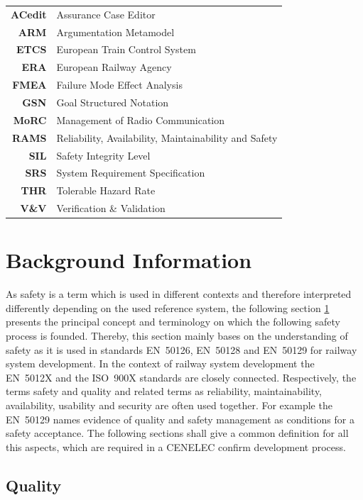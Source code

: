 \documentclass{template/openetcs_report}
\begin{document}
\begin{tabular}{rl}
\textbf{ACedit} & Assurance Case Editor \\ 
\textbf{ARM} & Argumentation  Metamodel \\ 
\textbf{ETCS} & European Train Control System \\ \textbf{ERA} & European Railway Agency \\ \textbf{FMEA} & Failure Mode Effect Analysis \\ 
\textbf{GSN} & Goal Structured Notation \\ 
\textbf{MoRC} & Management of Radio Communication \\ 
\textbf{RAMS} & Reliability, Availability, Maintainability and Safety \\
\textbf{SIL} & Safety Integrity Level \\ 
\textbf{SRS} & System Requirement Specification \\ 
\textbf{THR} & Tolerable Hazard Rate \\ 
\textbf{V\&V} & Verification \& Validation \\ 
\end{tabular} 




\section{Background Information}
\label{sec:Background}

As safety is a term which is used in different contexts and therefore interpreted differently depending on the used reference system, the following section \ref{sec:Background} presents the principal concept and terminology on which the following safety process is founded. Thereby, this section mainly bases on the understanding of safety as it is used in standards EN~50126, EN~50128 and EN~50129 for railway system development. In the context of railway system development the EN~5012X and the ISO~900X standards are closely connected. Respectively, the terms safety and quality and related terms as reliability, maintainability, availability, usability and security are often used together. For example the EN~50129 names evidence of quality and safety management as conditions for a safety acceptance. The following sections shall give a common definition for all this aspects, which are required in a CENELEC confirm development process. 

\subsection{Quality}
\end{document}
